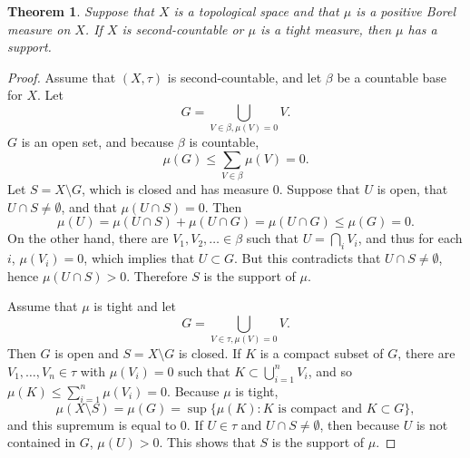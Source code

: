 \documentclass{article}
\newtheorem{theorem}{Theorem}
\theoremstyle{definition}
\begin{document}
\begin{theorem}
Suppose that $X$ is a topological space and that $\mu$ is a positive Borel measure on $X$. If
$X$ is second-countable or $\mu$ is a tight measure, then $\mu$ has a support.
\end{theorem}
\begin{proof}
Assume that $(X,\tau)$ is second-countable, and let
$\beta$ be a countable base for $X$. Let
\[
G = \bigcup_{V \in \beta, \mu(V)=0} V.
\]
$G$ is an open set, and
because $\beta$ is countable, 
\[
\mu(G) \leq \sum_{V \in \beta} \mu(V) = 0.
\]
Let $S = X \setminus G$, which is closed and has measure $0$.
Suppose that $U$ is open, that $U \cap S \neq \emptyset$, and  that
$\mu(U \cap S)=0$. Then 
\[
\mu(U) = \mu(U \cap S) + \mu(U \cap G)  = \mu(U \cap G) \leq \mu(G) = 0.
\]
On the other hand, there are $V_1,V_2,\ldots \in \beta$ such that $U = \bigcap_i V_i$, and thus for each $i$,
$\mu(V_i)=0$, which implies that $U \subset G$. But this contradicts that $U \cap S \neq \emptyset$, hence
$\mu(U \cap S)>0$. Therefore $S$ is the support of $\mu$.

Assume that $\mu$ is tight and let
\[
G = \bigcup_{V \in \tau, \mu(V) = 0} V.
\]
Then $G$ is open and $S = X \setminus G$ is closed. If $K$ is a compact subset of $G$, 
there are $V_1,\ldots,V_n \in \tau$ with $\mu(V_i)=0$ such that
$K \subset \bigcup_{i=1}^n V_i$, and so
$\mu(K) \leq \sum_{i=1}^n \mu(V_i) = 0$. Because $\mu$ is tight,
\[
\mu(X \setminus S) = \mu(G) = \sup \{\mu(K): \textrm{$K$ is compact and $K \subset G$}\},
\]
and this supremum is equal to $0$. If $U \in \tau$ and $U \cap S \neq \emptyset$, then because
$U$ is not contained in $G$, $\mu(U)>0$. This shows that $S$ is the support of $\mu$.
\end{proof}
\end{document}
